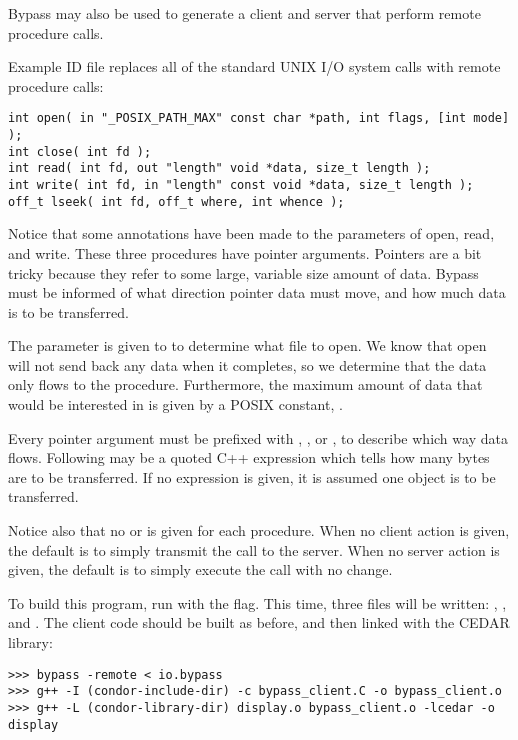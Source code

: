 Bypass may also be used to generate a client and server that perform remote procedure calls.

Example ID file  replaces all of the standard UNIX I/O system calls with remote procedure calls:

\begin{verbatim}
int open( in "_POSIX_PATH_MAX" const char *path, int flags, [int mode] );
int close( int fd );
int read( int fd, out "length" void *data, size_t length );
int write( int fd, in "length" const void *data, size_t length );
off_t lseek( int fd, off_t where, int whence );
\end{verbatim}

Notice that some annotations have been made to the parameters of open,
read, and write.  These three procedures have pointer arguments.  Pointers
are a bit tricky because they refer to some large, variable size amount of 
data.  Bypass must be informed of what direction pointer data must move,
and how much data is to be transferred.

The parameter  is given to  to determine what
file to open.  We know that open will not send back any data when it completes,
so we determine that the  data only flows  to
the procedure.  Furthermore, the maximum amount of data that 
would be interested in is given by a POSIX constant, .

Every pointer argument must be prefixed with , , or
, to describe which way data flows.  Following may be a 
quoted C++ expression which tells how many bytes are to be transferred.
If no expression is given, it is assumed one object is to be transferred.

Notice also that no  or  is
given for each procedure.  When no client action is given, the default
is to simply transmit the call to the server.  When no server action is
given, the default is to simply execute the call with no change.

To build this program, run  with the  flag.  This time, three files will be written: , , and .  The client code should be built as before, and then linked with the CEDAR library:

\begin{verbatim}
>>> bypass -remote < io.bypass
>>> g++ -I (condor-include-dir) -c bypass_client.C -o bypass_client.o
>>> g++ -L (condor-library-dir) display.o bypass_client.o -lcedar -o display
\end{verbatim}

